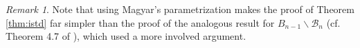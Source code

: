 \documentclass[12pt]{amsart}
\numberwithin{equation}{section}
\newtheorem{prop}[thm]{Proposition}
\theoremstyle{remark}
\newtheorem{rem}[thm]{Remark}
\theoremstyle{definition}
\newcommand{\B}{\mathcal{B}}
\newcommand{\he}{\hat{e}}
\newcommand{\F}{\mathcal{F}}
\newcommand{\calO}{\mathcal{O}}
\begin{document}

\begin{rem}\label{p:std}
Note that using Magyar's parametrization makes the proof of Theorem \ref{thm:istd}  far simpler than the proof of the analogous result for $B_{n-1}\backslash\B_{n}$ (cf. Theorem 4.7 of \cite{CE21II}), which used a more involved argument.
\end{rem}


\end{document}

